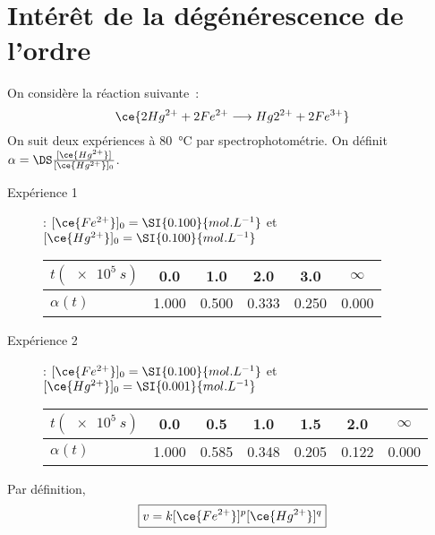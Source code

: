 \documentclass[a4paper, 11pt]{book}
\begin{document}
\section{Intérêt de la dégénérescence de l'ordre}
On considère la réaction suivante~:
\[\ce{2Hg^{2+} + 2Fe^{2+} \longrightarrow Hg2^{2+} + 2Fe^{3+}}\]
On suit deux expériences à \SI{80}{\degreeCelsius} par spectrophotométrie. On
définit $\alpha = \DS \frac{[\ce{Hg^{2+}}]}{[\ce{Hg^{2+}}]_0}$.
\begin{description}
	\item[Expérience 1] : $[\ce{Fe^{2+}}]_0 = \SI{0.100}{mol.L^{-1}}$ et
	      $[\ce{Hg^{2+}}]_0 = \SI{0.100}{mol.L^{-1}}$
	      \begin{center}
		      \begin{tabular}{lccccc}
			      \toprule
			      $t (\SI{e5}{s})$ &
			      \num{0.0}        & \num{1.0}   & \num{2.0}   & \num{3.0}   & $\infty$ \\
			      \midrule
			      $\alpha(t)$      &
			      \num{1.000}      & \num{0.500} & \num{0.333} & \num{0.250} &
			      \num{0.000}                                                           \\
			      \bottomrule
		      \end{tabular}
	      \end{center}
	\item[Expérience 2] : $[\ce{Fe^{2+}}]_0 = \SI{0.100}{mol.L^{-1}}$ et
	      $[\ce{Hg^{2+}}]_0 = \SI{0.001}{mol.L^{-1}}$
	      \begin{center}
		      \begin{tabular}{lcccccc}
			      \toprule
			      $t (\SI{e5}{s})$ &
			      \num{0.0}        & \num{0.5}   & \num{1.0}   & \num{1.5}   & \num{2.0} &
			      $\infty$                                                                 \\
			      \midrule
			      $\alpha(t)$      &
			      \num{1.000}      & \num{0.585} & \num{0.348} & \num{0.205} &
			      \num{0.122}      & \num{0.000}                                           \\
			      \bottomrule
		      \end{tabular}
	      \end{center}
\end{description}

{
Par définition,
\[\boxed{v = k[\ce{Fe^{2+}}]^p[\ce{Hg^{2+}}]^q}\]
}
\end{document}
